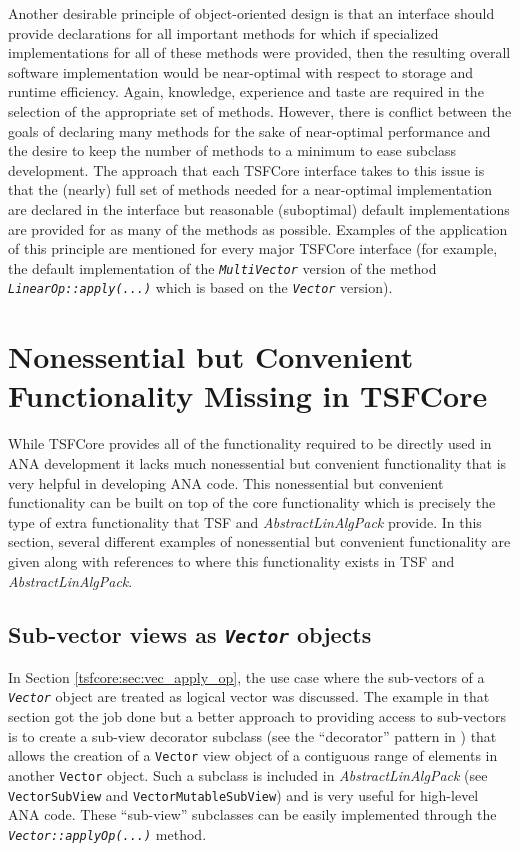 Another desirable principle of object-oriented design is that an
interface should provide declarations for all important methods for
which if specialized implementations for all of these methods were
provided, then the resulting overall software implementation would be
near-optimal with respect to storage and runtime efficiency.  Again,
knowledge, experience and taste are required in the selection of the
appropriate set of methods.  However, there is conflict between the
goals of declaring many methods for the sake of near-optimal
performance and the desire to keep the number of methods to a minimum
to ease subclass development.  The approach that each TSFCore
interface takes to this issue is that the (nearly) full set of methods
needed for a near-optimal implementation are declared in the interface
but reasonable (suboptimal) default implementations are provided for
as many of the methods as possible.  Examples of the application of
this principle are mentioned for every major TSFCore interface (for
example, the default implementation of the
\texttt{\textit{Multi\-Vector}} version of the method
\texttt{\textit{LinearOp\-::apply(\-...)}} which is based on
the \texttt{\textit{Vector}} version).

%
\section{Nonessential but Convenient Functionality Missing in TSFCore}
\label{tsfcore:sec:convenience_functionality}
%

While TSFCore provides all of the functionality required to be
directly used in ANA development it lacks much nonessential but convenient
functionality that is very helpful in developing ANA code.  This
nonessential but convenient functionality can be built on top of the core
functionality which is precisely the type of extra functionality that
TSF and \textit{AbstractLinAlgPack} provide.  In this section, several
different examples of nonessential but convenient functionality are given along
with references to where this functionality exists in TSF and
\textit{AbstractLinAlgPack}.

%
\subsection{Sub-vector views as \texttt{\textit{Vector}} objects}
%

In Section \ref{tsfcore:sec:vec_apply_op}, the use case where the
sub-vectors of a \texttt{\textit{Vector}} object are treated as logical
vector was discussed.  The example in that section got the job done
but a better approach to providing access to sub-vectors is to create a
sub-view decorator subclass (see the ``decorator'' pattern in
\cite{ref:gama_et_al_1995}) that allows the creation of a
\texttt{Vector} view object of a contiguous range of elements in
another \texttt{Vector} object.  Such a subclass is included in
\textit{AbstractLinAlgPack} (see \texttt{VectorSubView} and
\texttt{Vector\-Mutable\-Sub\-View}) and is very useful for high-level ANA
code.  These ``sub-view'' subclasses can be easily implemented through the
\texttt{\textit{Vector\-::applyOp(\-...)}} method.

